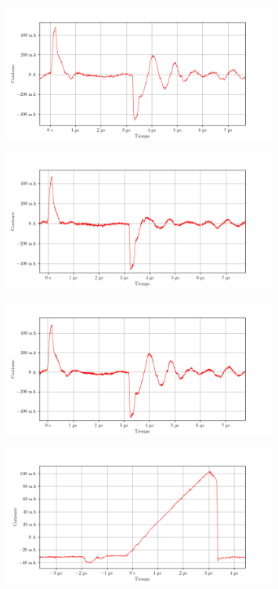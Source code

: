 \begin{figure}[ht]
    \centering
    \includegraphics[width=0.8\textwidth]{images/capturas-osciloscopio/17-11-2022/17.png}
    \caption{}
    \label{fig:osc:17}
\end{figure}

\begin{figure}[ht]
    \centering
    \includegraphics[width=0.8\textwidth]{images/capturas-osciloscopio/17-11-2022/18.png}
    \caption{}
    \label{fig:osc:18}
\end{figure}

\begin{figure}[ht]
    \centering
    \includegraphics[width=0.8\textwidth]{images/capturas-osciloscopio/17-11-2022/19.png}
    \caption{}
    \label{fig:osc:19}
\end{figure}

\begin{figure}[ht]
    \centering
    \includegraphics[width=0.8\textwidth]{images/capturas-osciloscopio/17-11-2022/20.png}
    \caption{}
    \label{fig:osc:20}
\end{figure}

